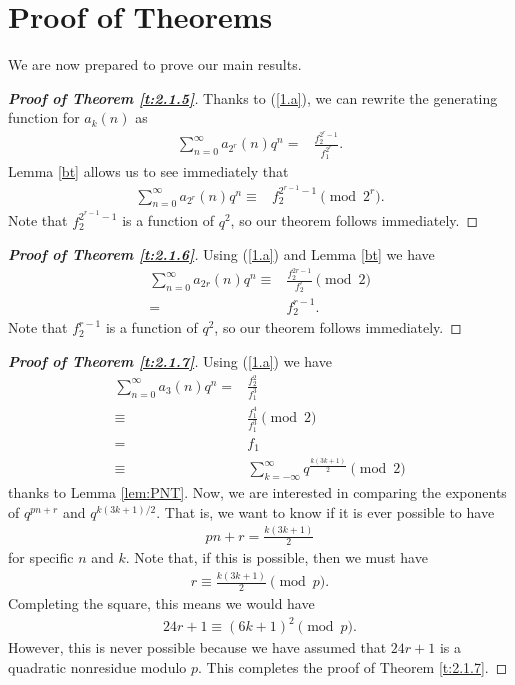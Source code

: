 \documentclass[a4paper,12pt,reqno]{amsart}
\numberwithin{equation}{section}
\begin{document}
	\section{Proof of Theorems }
	
\noindent 
We are now prepared to prove our main results.
	\begin{proof}[\it\textbf{Proof of Theorem \ref{t:2.1.5}}]
	Thanks to (\ref{1.a}), we can rewrite the generating function for $a_k(n)$ as 
	\begin{align*}
		\sum_{n=0}^{\infty}a_{2^r}(n)q^n=&\frac{f_2^{{2^r}-1}}{f_1^{2^r}}.
	\end{align*}
	Lemma \ref{bt} allows us to see immediately that
	\begin{align}
	\sum_{n=0}^{\infty}a_{2^r}(n)q^n\equiv& f_2^{{2^{r-1}}-1}\pmod{2^r}.\label{3.a}
	\end{align}
Note that $f_2^{{2^{r-1}}-1}$ is a function of $q^2$, so our theorem follows immediately.
	\end{proof}
	\begin{proof}[\it\textbf{Proof of Theorem \ref{t:2.1.6}}]Using (\ref{1.a}) and Lemma \ref{bt} we have
	\begin{align*}
		\sum_{n=0}^{\infty}a_{2r}(n)q^n
		\equiv& \frac{f_2^{2r-1}}{f_2^{r}}\pmod{2} \\
           =& f_2^{r-1}.  
	\end{align*}
Note that $f_2^{r-1}$ is a function of $q^2$, so our theorem follows immediately.
	\end{proof}
	\begin{proof}[\it\textbf{Proof of Theorem \ref{t:2.1.7}}]Using (\ref{1.a})
		 we have
		\begin{align*}
			\sum_{n=0}^{\infty}a_3(n)q^n=&\frac{f_2^2}{f_1^3}\\
			\equiv& \frac{f_1^4}{f_1^3}\pmod{2}\\
			=&f_1\\
			\equiv&\sum_{k =-\infty}^\infty q^{\frac{k(3k+1)}{2}} \pmod{2}
		\end{align*}
		thanks to Lemma \ref{lem:PNT}.
		Now, we are interested in comparing the exponents of $q^{pn+r}$ and $q^{k(3k+1)/2}$. That
		is, we want to know if it is ever possible to have
		\begin{align*}
			pn+r = \frac{k(3k+1)}{2}
		\end{align*}
		for specific $n$ and $k$. Note that, if this is possible, then we must have
		\begin{align*}
			r \equiv \frac{k(3k+1)}{2} \pmod{p}.
		\end{align*}
		Completing the square, this means we would have
		\begin{align*}
			24r + 1 \equiv (6k + 1)^2 \pmod{p}.
		\end{align*}
		However, this is never possible because we have assumed that $24r+1$ is a quadratic
		nonresidue modulo $p$. This completes the proof of Theorem \ref{t:2.1.7}.			
	\end{proof}
\end{document}
